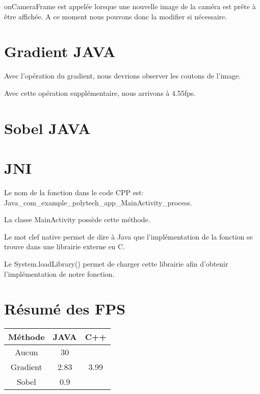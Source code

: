 \documentclass{report}
\begin{document}
				onCameraFrame est appelée lorsque une nouvelle image de la caméra est prête à être affichée.
				A ce moment nous pouvons donc la modifier si nécessaire.
		\section{Gradient JAVA}
			Avec l'opération du gradient, nous devrions observer les coutons de l'image.
			
			Avec cette opération supplémentaire, nous arrivons à 4.55fps.
			
		\section{Sobel JAVA}
		
		\section{JNI}
			Le nom de la fonction dans le code CPP est: Java\_com\_example\_polytech\_app\_MainActivity\_process.
			
			La classe MainActivity possède cette méthode.
			
			Le mot clef native permet de dire à Java que l'implémentation de la fonction se trouve dans une librairie externe en C.
			
			Le System.loadLibrary() permet de charger cette librairie afin d'obtenir l'implémentation de notre fonction.
			
		\section{Résumé des FPS}
			\begin{tabular}{|c|c|c|}
				\hline
				Méthode & JAVA & C++\\\hline
				Aucun & 30 & \\\hline
				Gradient & 2.83 & 3.99\\\hline
				Sobel & 0.9 & \\\hline
			\end{tabular}
\end{document}
